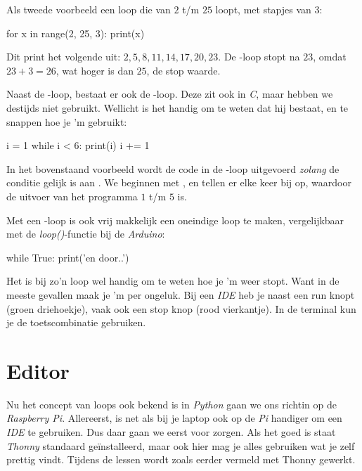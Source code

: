 Als tweede voorbeeld een loop die van $2$ t/m $25$ loopt, met stapjes van $3$:
\begin{python}
for x in range(2, 25, 3):
	print(x)
\end{python}
Dit print het volgende uit: $2, 5, 8, 11, 14, 17, 20, 23$. De -loop stopt na $23$, omdat $23+3 = 26$, wat hoger is dan $25$, de stop waarde. \newline

Naast de -loop, bestaat er ook de -loop. Deze zit ook in \textit{C}, maar hebben we destijds niet gebruikt. Wellicht is het handig om te weten dat hij bestaat, en te snappen hoe je 'm gebruikt:
\begin{python}
i = 1
while i < 6:
	print(i)
	i += 1
\end{python}
In het bovenstaand voorbeeld wordt de code in de -loop uitgevoerd \textit{zolang} de conditie  gelijk is aan . We beginnen met , en tellen er elke keer  bij op, waardoor de uitvoer van het programma $1$ t/m $5$ is. \newline

Met een -loop is ook vrij makkelijk een oneindige loop te maken, vergelijkbaar met de \textit{loop()}-functie bij de \textit{Arduino}:
\begin{python}
while True:
	print('en door..')
\end{python}

\begin{remark}
Het is bij zo'n loop wel handig om te weten hoe je 'm weer stopt. Want in de meeste gevallen maak je 'm per ongeluk. Bij een \textit{IDE} heb je naast een run knopt (groen driehoekje), vaak ook een stop knop (rood vierkantje). In de terminal kun je de toetscombinatie  gebruiken. 
\end{remark}

\newpage

\section{Editor}
Nu het concept van loops ook bekend is in \textit{Python} gaan we ons richtin op de \textit{Raspberry Pi}. Allereerst, is net als bij je laptop ook op de \textit{Pi} handiger om een \textit{IDE} te gebruiken. Dus daar gaan we eerst voor zorgen. Als het goed is staat \textit{Thonny} standaard geïnstalleerd, maar ook hier mag je alles gebruiken wat je zelf prettig vindt. Tijdens de lessen wordt zoals eerder vermeld met Thonny gewerkt. \newline

